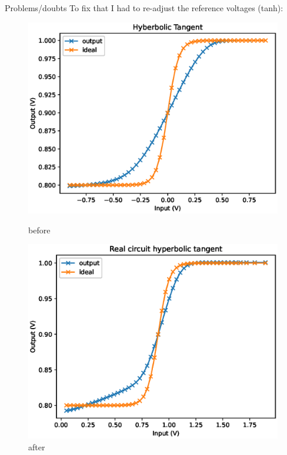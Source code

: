 \documentclass[table]{beamer}
\begin{document}
\begin{frame}{Problems/doubts}
  To fix that I had to re-adjust the reference voltages (tanh):
  \begin{figure}[!tbp]
    \centering
    \begin{minipage}[b]{0.4\textwidth}
      \centering
      \includegraphics[width=\textwidth]{activation/tanh}
      \caption{before}
    \end{minipage}
    \hspace{20pt}
    \begin{minipage}[b]{0.4\textwidth}
      \centering
      \includegraphics[width=\textwidth]{activation/realTanh}
      \caption{after}
    \end{minipage}
  \end{figure}
\end{frame}
\end{document}
